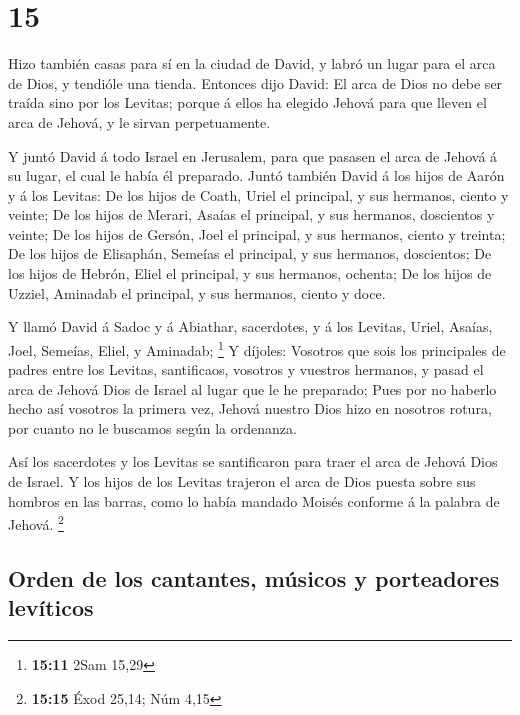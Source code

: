 \hypertarget{section-14}{%
\section{15}\label{section-14}}

 Hizo también casas para sí en la ciudad de David, y labró
un lugar para el arca de Dios, y tendióle una tienda. 
Entonces dijo David: El arca de Dios no debe ser traída sino por los
Levitas; porque á ellos ha elegido Jehová para que lleven el arca de
Jehová, y le sirvan perpetuamente.

 Y juntó David á todo Israel en Jerusalem, para que
pasasen el arca de Jehová á su lugar, el cual le había él preparado.
 Juntó también David á los hijos de Aarón y á los Levitas:
 De los hijos de Coath, Uriel el principal, y sus
hermanos, ciento y veinte;  De los hijos de Merari, Asaías
el principal, y sus hermanos, doscientos y veinte;  De los
hijos de Gersón, Joel el principal, y sus hermanos, ciento y treinta;
 De los hijos de Elisaphán, Semeías el principal, y sus
hermanos, doscientos;  De los hijos de Hebrón, Eliel el
principal, y sus hermanos, ochenta;  De los hijos de
Uzziel, Aminadab el principal, y sus hermanos, ciento y doce.

 Y llamó David á Sadoc y á Abiathar, sacerdotes, y á los
Levitas, Uriel, Asaías, Joel, Semeías, Eliel, y Aminadab; \footnote{\textbf{15:11}
  2Sam 15,29}  Y díjoles: Vosotros que sois los
principales de padres entre los Levitas, santificaos, vosotros y
vuestros hermanos, y pasad el arca de Jehová Dios de Israel al lugar que
le he preparado;  Pues por no haberlo hecho así vosotros
la primera vez, Jehová nuestro Dios hizo en nosotros rotura, por cuanto
no le buscamos según la ordenanza.

 Así los sacerdotes y los Levitas se santificaron para
traer el arca de Jehová Dios de Israel.  Y los hijos de
los Levitas trajeron el arca de Dios puesta sobre sus hombros en las
barras, como lo había mandado Moisés conforme á la palabra de Jehová.
\footnote{\textbf{15:15} Éxod 25,14; Núm 4,15}

\hypertarget{orden-de-los-cantantes-muxfasicos-y-porteadores-levuxedticos}{%
\subsection{Orden de los cantantes, músicos y porteadores
levíticos}\label{orden-de-los-cantantes-muxfasicos-y-porteadores-levuxedticos}}

